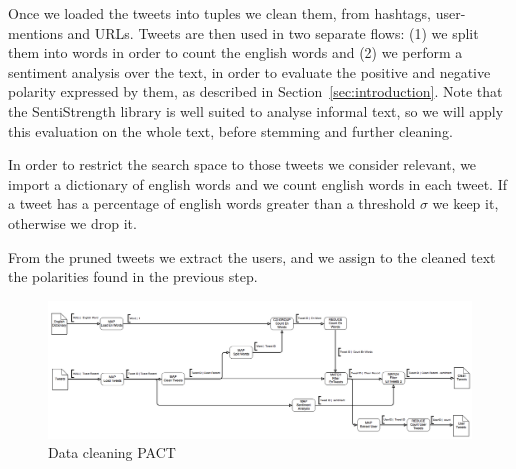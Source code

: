 Once we loaded the tweets into tuples we clean them, from hashtags, user-mentions and URLs. 
Tweets are then used in two separate flows: (1) we split them into words in order to count the english words and (2) we perform a sentiment analysis over the text, in order to evaluate the positive and negative polarity expressed by them, as described in Section~\ref{sec:introduction}.
Note that the SentiStrength library is well suited to analyse informal text, so we will apply this evaluation on the whole text, before stemming and further cleaning. 

In order to restrict the search space to those tweets we consider relevant, we import a dictionary of english words and we count english words in each tweet. 
If a tweet has a percentage of english words greater than a threshold $\sigma$ we keep it, otherwise we drop it. 

From the pruned tweets we extract the users, and we assign to the cleaned text the polarities found in the previous step. 

\begin{figure}[ht]
\includegraphics[width=\textwidth]{images/strato_pact_pt1.png} 
\caption{Data cleaning PACT}
\label{fig:cleaning}
\end{figure}

